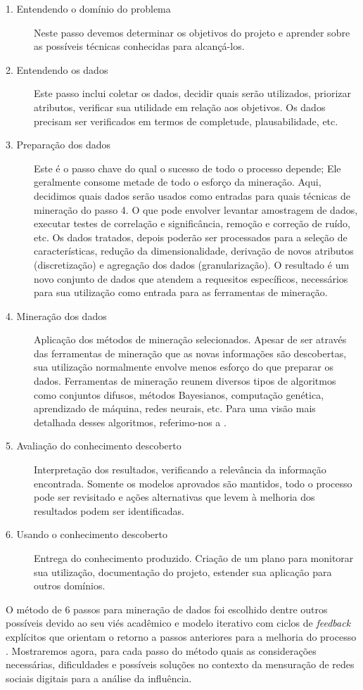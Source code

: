 \begin{description}
\item[1. Entendendo o domínio do problema]Neste passo devemos determinar os
objetivos do projeto e aprender sobre as possíveis técnicas conhecidas
para alcançá-los.
\item[2. Entendendo os dados]Este passo inclui coletar os dados, decidir quais
serão utilizados, priorizar atributos, verificar sua utilidade em relação aos
objetivos. Os dados precisam ser verificados em termos de completude,
plausabilidade, etc.
\item[3. Preparação dos dados]Este é o passo chave do qual o sucesso de todo o
processo depende; Ele geralmente consome metade de todo o esforço da mineração.
Aqui, decidimos quais dados serão usados como entradas para quais técnicas de
mineração do passo 4. O que pode envolver levantar amostragem de dados, executar
testes de correlação e significância, remoção e correção de ruído, etc. Os dados
tratados, depois poderão ser processados para a seleção de características,
redução da dimensionalidade, derivação de novos atributos (discretização) e
agregação dos dados (granularização). O resultado é um novo conjunto de dados
que atendem a requesitos específicos, necessários para sua utilização como
entrada para as ferramentas de mineração.
\item[4. Mineração dos dados]Aplicação dos métodos de mineração selecionados.
Apesar de ser através das ferramentas de mineração que as novas informações
são descobertas, sua utilização normalmente envolve menos esforço do que
preparar os dados. Ferramentas de mineração reunem diversos tipos de algoritmos
como conjuntos difusos, métodos Bayesianos, computação genética,
aprendizado de máquina, redes neurais, etc. Para uma visão mais detalhada desses
algoritmos, referimo-nos a \cite{JiaweiHan2006}.
\item[5. Avaliação do conhecimento descoberto]Interpretação dos
resultados, verificando a relevância da informação encontrada. Somente os
modelos aprovados são mantidos, todo o processo pode ser revisitado e ações
alternativas que levem à melhoria dos resultados podem ser identificadas.
\item[6. Usando o conhecimento descoberto]Entrega do conhecimento produzido.
Criação de um plano para monitorar sua utilização, documentação do projeto,
estender sua aplicação para outros domínios.
\end{description}

O método de 6 passos para mineração de dados foi escolhido dentre outros
possíveis devido ao seu viés acadêmico e modelo iterativo com ciclos de
\emph{feedback} explícitos que orientam o retorno a passos anteriores para a
melhoria do processo \citep{KURGAN2006}. Mostraremos agora, para cada passo do
método quais as considerações necessárias, dificuldades e possíveis soluções no
contexto da mensuração de redes sociais digitais para a análise da influência.

